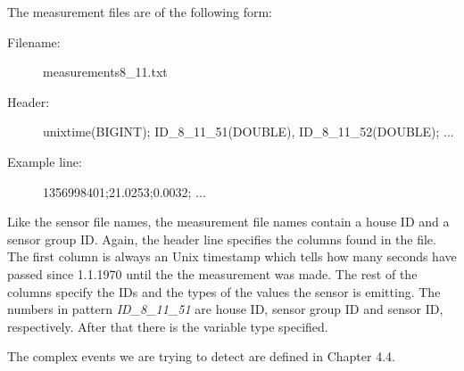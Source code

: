 The measurement files are of the following form:

\begin{description}
\item[Filename:]{measurements8\_11.txt}
\item[Header:]{unixtime(BIGINT); ID\_8\_11\_51(DOUBLE), ID\_8\_11\_52(DOUBLE); ...}
\item[Example line:]{1356998401;21.0253;0.0032; ...}
\end{description}


Like the sensor file names, the measurement file names contain a house ID and a sensor group ID. Again, the header line specifies the columns found in the file. The first column is always an Unix timestamp which tells how many seconds have passed since 1.1.1970 until the the measurement was made. The rest of the columns specify the IDs and the types of the values the sensor is emitting. The numbers in pattern \emph{ID\_8\_11\_51} are house ID, sensor group ID and sensor ID, respectively. After that there is the variable type specified.

The complex events we are trying to detect are defined in Chapter 4.4.

